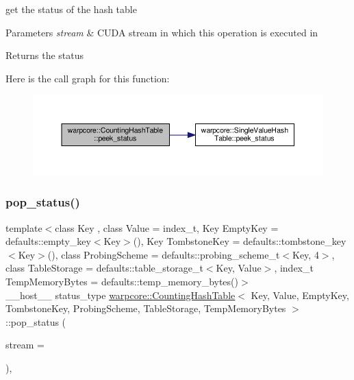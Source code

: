 get the status of the hash table 


\begin{DoxyParams}{Parameters}
{\em stream} & C\+U\+DA stream in which this operation is executed in \\
\hline
\end{DoxyParams}
\begin{DoxyReturn}{Returns}
the status 
\end{DoxyReturn}
Here is the call graph for this function\+:
\nopagebreak
\begin{figure}[H]
\begin{center}
\leavevmode
\includegraphics[width=350pt]{classwarpcore_1_1CountingHashTable_ae9e388f29dae1952c2da7fed32415e35_cgraph}
\end{center}
\end{figure}
\mbox{\label{classwarpcore_1_1CountingHashTable_a9313aefeadf39f1c0512f131859922ab}} 
\subsubsection{\texorpdfstring{pop\+\_\+status()}{pop\_status()}}
{\footnotesize\ttfamily template$<$class Key , class Value  = index\+\_\+t, Key Empty\+Key = defaults\+::empty\+\_\+key$<$\+Key$>$(), Key Tombstone\+Key = defaults\+::tombstone\+\_\+key$<$\+Key$>$(), class Probing\+Scheme  = defaults\+::probing\+\_\+scheme\+\_\+t$<$\+Key, 4$>$, class Table\+Storage  = defaults\+::table\+\_\+storage\+\_\+t$<$\+Key, Value$>$, index\+\_\+t Temp\+Memory\+Bytes = defaults\+::temp\+\_\+memory\+\_\+bytes()$>$ \\
\+\_\+\+\_\+host\+\_\+\+\_\+ status\+\_\+type \hyperlink{classwarpcore_1_1CountingHashTable}{warpcore\+::\+Counting\+Hash\+Table}$<$ Key, Value, Empty\+Key, Tombstone\+Key, Probing\+Scheme, Table\+Storage, Temp\+Memory\+Bytes $>$\+::pop\+\_\+status (\begin{DoxyParamCaption}\item[{cuda\+Stream\+\_\+t}]{stream = {} }\end{DoxyParamCaption})\hspace{0.3cm}{\ttfamily [inline]}, {\ttfamily [noexcept]}}




